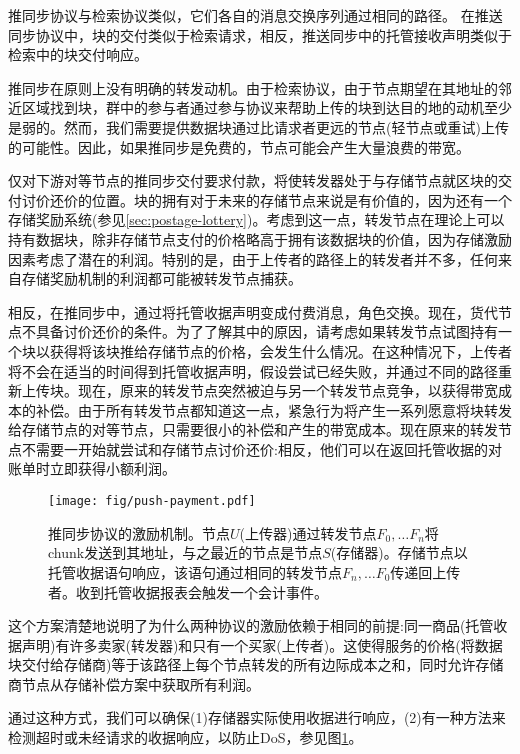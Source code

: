 推同步协议与检索协议类似，它们各自的消息交换序列通过相同的路径。
在推送同步协议中，块的交付类似于检索请求，相反，推送同步中的托管接收声明类似于检索中的块交付响应。

推同步在原则上没有明确的转发动机。由于检索协议，由于节点期望在其地址的邻近区域找到块，群中的参与者通过参与协议来帮助上传的块到达目的地的动机至少是弱的。然而，我们需要提供数据块通过比请求者更远的节点(轻节点或重试)上传的可能性。因此，如果推同步是免费的，节点可能会产生大量浪费的带宽。

仅对下游对等节点的推同步交付要求付款，将使转发器处于与存储节点就区块的交付讨价还价的位置。块的拥有对于未来的存储节点来说是有价值的，因为还有一个存储奖励系统(参见\ref{sec:postage-lottery})。考虑到这一点，转发节点在理论上可以持有数据块，除非存储节点支付的价格略高于拥有该数据块的价值，因为存储激励因素考虑了潜在的利润。特别的是，由于上传者的路径上的转发者并不多，任何来自存储奖励机制的利润都可能被转发节点捕获。

相反，在推同步中，通过将托管收据声明变成付费消息，角色交换。现在，货代节点不具备讨价还价的条件。为了了解其中的原因，请考虑如果转发节点试图持有一个块以获得将该块推给存储节点的价格，会发生什么情况。在这种情况下，上传者将不会在适当的时间得到托管收据声明，假设尝试已经失败，并通过不同的路径重新上传块。现在，原来的转发节点突然被迫与另一个转发节点竞争，以获得带宽成本的补偿。由于所有转发节点都知道这一点，紧急行为将产生一系列愿意将块转发给存储节点的对等节点，只需要很小的补偿和产生的带宽成本。现在原来的转发节点不需要一开始就尝试和存储节点讨价还价:相反，他们可以在返回托管收据的对账单时立即获得小额利润。 


\begin{figure}[htbp]
\centering
\texttt{[image: fig/push-payment.pdf]}
\caption[推同步协议的激励机制\statusgreen]{推同步协议的激励机制。节点$U$(上传器)通过转发节点$F_0, \ldots F_n$将chunk发送到其地址，与之最近的节点是节点$S$(存储器)。存储节点以托管收据语句响应，该语句通过相同的转发节点$F_n, \ldots F_0$传递回上传者。收到托管收据报表会触发一个会计事件。}
\label{fig:syncing-swap}
\end{figure}

这个方案清楚地说明了为什么两种协议的激励依赖于相同的前提:同一商品(托管收据声明)有许多卖家(转发器)和只有一个买家(上传者)。这使得服务的价格(将数据块交付给存储商)等于该路径上每个节点转发的所有边际成本之和，同时允许存储商节点从存储补偿方案中获取所有利润。

通过这种方式，我们可以确保(1)存储器实际使用收据进行响应，(2)有一种方法来检测超时或未经请求的收据响应，以防止DoS，参见图\ref{fig:syncing-swap}。

